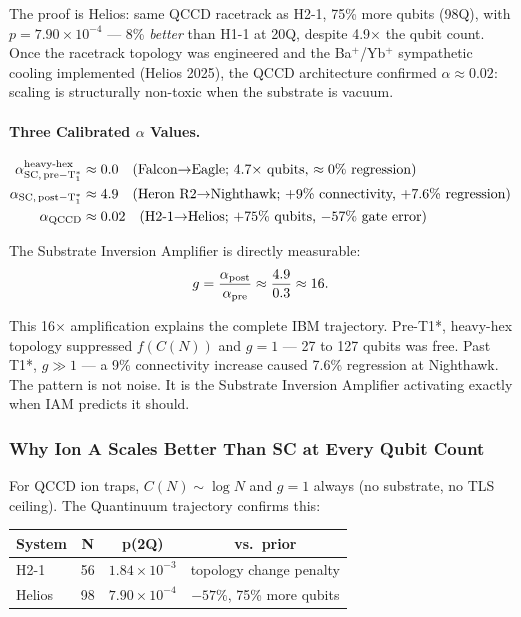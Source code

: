 \documentclass[12pt,a4paper]{article}
\begin{document}
The proof is Helios: same QCCD racetrack as H2-1, 75\% more qubits
(98Q), with $p = 7.90\times10^{-4}$ --- 8\% \emph{better} than H1-1
at 20Q, despite 4.9$\times$ the qubit count. Once the racetrack
topology was engineered and the Ba$^+$/Yb$^+$ sympathetic cooling
implemented (Helios 2025), the QCCD architecture confirmed $\alpha \approx 0.02$:
scaling is structurally non-toxic when the substrate is vacuum.

\paragraph{Three Calibrated $\alpha$ Values.}

\begin{align}
\alpha_{\rm SC,\,pre-T_1^*}^{\rm heavy\text{-}hex}
  &\approx 0.0 \quad\text{(Falcon$\to$Eagle; 4.7$\times$ qubits, $\approx0\%$ regression)} \\
\alpha_{\rm SC,\,post-T_1^*}
  &\approx 4.9 \quad\text{(Heron R2$\to$Nighthawk; $+9\%$ connectivity, $+7.6\%$ regression)} \\
\alpha_{\rm QCCD}
  &\approx 0.02 \quad\text{(H2-1$\to$Helios; $+75\%$ qubits, $-57\%$ gate error)}
\end{align}

The Substrate Inversion Amplifier is directly measurable:
\begin{equation}
g = \frac{\alpha_{\rm post}}{\alpha_{\rm pre}}
  \approx \frac{4.9}{0.3} \approx 16.
\label{eq:amplifier}
\end{equation}

This 16$\times$ amplification explains the complete IBM trajectory.
Pre-T1*, heavy-hex topology suppressed $f(C(N))$ and $g = 1$ ---
27 to 127 qubits was free. Past T1*, $g \gg 1$ --- a 9\% connectivity
increase caused 7.6\% regression at Nighthawk. The pattern is not
noise. It is the Substrate Inversion Amplifier activating exactly when
IAM predicts it should.

\subsubsection{Why Ion A Scales Better Than SC at Every Qubit Count}

For QCCD ion traps, $C(N) \sim \log N$ and $g = 1$ always (no substrate,
no TLS ceiling). The Quantinuum trajectory confirms this:

\begin{center}
\begin{tabular}{lccc}
\toprule
\textbf{System} & \textbf{N} & \textbf{p(2Q)} & \textbf{vs.\ prior} \\
\midrule
H2-1 & 56 & $1.84 \times 10^{-3}$ & topology change penalty \\
Helios & 98 & $7.90 \times 10^{-4}$ & $-57\%$, 75\% more qubits \\
\bottomrule
\end{tabular}
\end{center}
\end{document}
